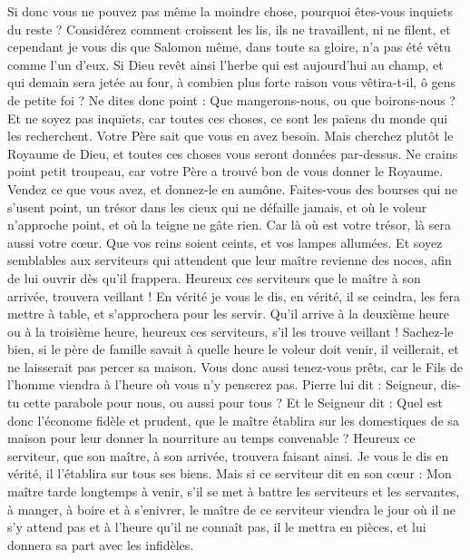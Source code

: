 \begin{multicols}{2}
Si donc vous ne pouvez pas même la moindre chose, pourquoi êtes-vous inquiets du reste ?
Considérez comment croissent les lis, ils ne travaillent, ni ne filent, et cependant je vous dis que Salomon même, dans toute sa gloire, n’a pas été vêtu comme l'un d'eux.
Si Dieu revêt ainsi l'herbe qui est aujourd'hui au champ, et qui demain sera jetée au four, à combien plus forte raison vous vêtira-t-il, ô gens de petite foi ?
Ne dites donc point : Que mangerons-nous, ou que boirons-nous ? Et ne soyez pas inquiets,
car toutes ces choses, ce sont les païens du monde qui les recherchent. Votre Père sait que vous en avez besoin.
Mais cherchez plutôt le Royaume de Dieu, et toutes ces choses vous seront données par-dessus.
Ne crains point petit troupeau, car votre Père a trouvé bon de vous donner le Royaume.
Vendez ce que vous avez, et donnez-le en aumône. Faites-vous des bourses qui ne s’usent point, un trésor dans les cieux qui ne défaille jamais, et où le voleur n'approche point, et où la teigne ne gâte rien.
Car là où est votre trésor, là sera aussi votre cœur.
Que vos reins soient ceints, et vos lampes allumées.
Et soyez semblables aux serviteurs qui attendent que leur maître revienne des noces, afin de lui ouvrir dès qu’il frappera.
Heureux ces serviteurs que le maître à son arrivée, trouvera veillant ! En vérité je vous le dis, en vérité, il se ceindra, les fera mettre à table, et s’approchera pour les servir.
Qu’il arrive à la deuxième heure ou à la troisième heure, heureux ces serviteurs, s’il les trouve veillant !
Sachez-le bien, si le père de famille savait à quelle heure le voleur doit venir, il veillerait, et ne laisserait pas percer sa maison.
Vous donc aussi tenez-vous prêts, car le Fils de l'homme viendra à l'heure où vous n'y penserez pas.
Pierre lui dit : Seigneur, dis-tu cette parabole pour nous, ou aussi pour tous ?
Et le Seigneur dit : Quel est donc l’économe fidèle et prudent, que le maître établira sur les domestiques de sa maison pour leur donner la nourriture au temps convenable ?
Heureux ce serviteur, que son maître, à son arrivée, trouvera faisant ainsi.
Je vous le dis en vérité, il l'établira sur tous ses biens.
Mais si ce serviteur dit en son cœur : Mon maître tarde longtemps à venir, s’il se met à battre les serviteurs et les servantes, à manger, à boire et à s'enivrer,
le maître de ce serviteur viendra le jour où il ne s’y attend pas et à l'heure qu'il ne connaît pas, il le mettra en pièces, et lui donnera sa part avec les infidèles.

\end{multicols}
